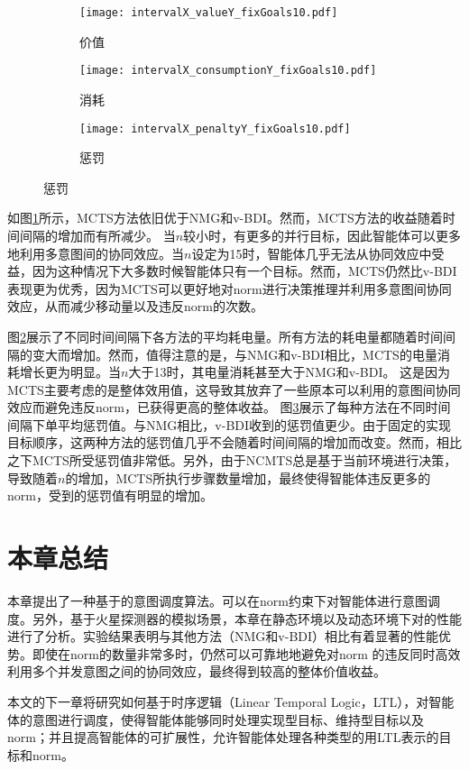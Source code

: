 \begin{figure}
\centering
\begin{subfigure}{.47\textwidth}
\centering
\texttt{[image: intervalX\_valueY\_fixGoals10.pdf]}
\caption{价值}
\captionsetup{justification=centering}
\label{fig:intervalX_valueY_fixGoals10}
\end{subfigure}

\begin{subfigure}{.47\textwidth}
  \centering
  \texttt{[image: intervalX\_consumptionY\_fixGoals10.pdf]}
  \caption{消耗}
  \captionsetup{justification=centering}
  \label{fig:intervalX_consumptionY_fixGoals10}
\end{subfigure}
\begin{subfigure}{.47\textwidth}
  \centering
  \texttt{[image: intervalX\_penaltyY\_fixGoals10.pdf]}
  \caption{惩罚}
  \captionsetup{justification=centering}
  \label{fig:intervalX_penaltyY_fixGoals10}
\end{subfigure}
\captionsetup{justification=centering}
\label{fig:all_fixGoals10Norms30}
\end{figure}
如图\ref{fig:intervalX_valueY_fixGoals10}所示，MCTS方法依旧优于NMG和v-BDI。然而，MCTS方法的收益随着时间间隔的增加而有所减少。
当$n$较小时，有更多的并行目标，因此智能体可以更多地利用多意图间的协同效应。当$n$设定为15时，智能体几乎无法从协同效应中受益，因为这种情况下大多数时候智能体只有一个目标。然而，MCTS仍然比v-BDI表现更为优秀，因为MCTS可以更好地对norm进行决策推理并利用多意图间协同效应，从而减少移动量以及违反norm的次数。

图\ref{fig:intervalX_consumptionY_fixGoals10}展示了不同时间间隔下各方法的平均耗电量。所有方法的耗电量都随着时间间隔的变大而增加。然而，值得注意的是，与NMG和v-BDI相比，MCTS的电量消耗增长更为明显。当$n$大于13时，其电量消耗甚至大于NMG和v-BDI。
这是因为MCTS主要考虑的是整体效用值，这导致其放弃了一些原本可以利用的意图间协同效应而避免违反norm，已获得更高的整体收益。
图\ref{fig:intervalX_penaltyY_fixGoals10}展示了每种方法在不同时间间隔下单平均惩罚值。与NMG相比，v-BDI收到的惩罚值更少。由于固定的实现目标顺序，这两种方法的惩罚值几乎不会随着时间间隔的增加而改变。然而，相比之下MCTS所受惩罚值非常低。另外，由于NCMTS总是基于当前环境进行决策，导致随着$n$的增加，MCTS所执行步骤数量增加，最终使得智能体违反更多的norm，受到的惩罚值有明显的增加。
\section{本章总结}
本章提出了一种基于\SA 的意图调度算法\SAN 。\SAN 可以在norm约束下对智能体进行意图调度。另外，基于火星探测器的模拟场景，本章在静态环境以及动态环境下对\SAN 的性能进行了分析。实验结果表明\SAN 与其他方法（NMG和v-BDI）相比有着显著的性能优势。即使在norm的数量非常多时，\SAN 仍然可以可靠地地避免对norm
的违反同时高效利用多个并发意图之间的协同效应，最终得到较高的整体价值收益。

本文的下一章将研究如何基于时序逻辑（Linear Temporal Logic，LTL），对智能体的意图进行调度，使得智能体能够同时处理实现型目标、维持型目标以及norm；并且提高智能体的可扩展性，允许智能体处理各种类型的用LTL表示的目标和norm。
